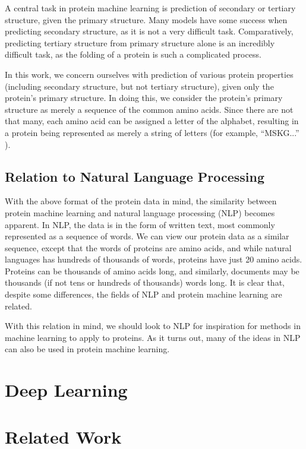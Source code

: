A central task in protein machine learning is prediction of secondary or tertiary structure, given the primary structure. Many models have some success when predicting secondary structure, as it is not a very difficult task. Comparatively, predicting tertiary structure from primary structure alone is an incredibly difficult task, as the folding of a protein is such a complicated process.

In this work, we concern ourselves with prediction of various protein properties (including secondary structure, but not tertiary structure), given only the protein's primary structure. In doing this, we consider the protein's primary structure as merely a sequence of the common amino acids. Since there are not that many, each amino acid can be assigned a letter of the alphabet, resulting in a protein being represented as merely a string of letters (for example, ``MSKG...'' ).

\subsection{Relation to Natural Language Processing}
With the above format of the protein data in mind, the similarity between protein machine learning and natural language processing (NLP) becomes apparent. In NLP, the data is in the form of written text, most commonly represented as a sequence of words. We can view our protein data as a similar sequence, except that the words of proteins are amino acids, and while natural languages has hundreds of thousands of words, proteins have just 20 amino acids. Proteins can be thousands of amino acids long, and similarly, documents may be thousands (if not tens or hundreds of thousands) words long. It is clear that, despite some differences, the fields of NLP and protein machine learning are related.

With this relation in mind, we should look to NLP for inspiration for methods in machine learning to apply to proteins. As it turns out, many of the ideas in NLP can also be used in protein machine learning.

\section{Deep Learning}


\section{Related Work}

